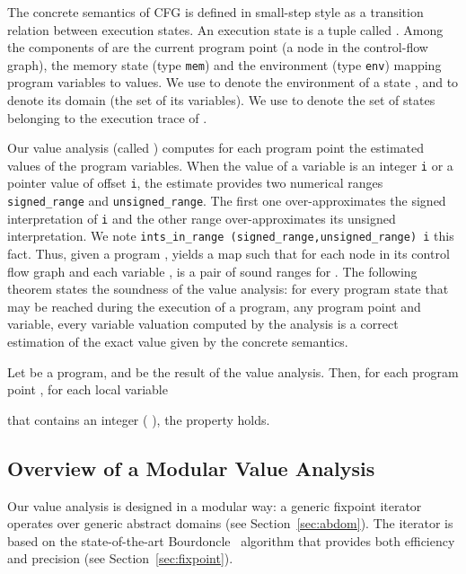 The concrete semantics of CFG is defined in small-step style as a
transition relation between execution states.  
An execution state is a tuple called . Among the components of
 are the current program point (\ie a node in the control-flow graph), 
the memory state (type \lstinline!mem!) and the environment
(type \lstinline!env!) mapping program variables to values.  
We use  to denote the environment of a state ,
and  to denote its domain (\ie the set of its
variables). We use 
 to denote the set of states belonging to the
execution trace of .

Our value analysis (called {\tt \valanal{}}) computes
for each program point the estimated values of the program variables.
When the value of a variable is an integer \lstinline!i!  or a pointer
value of offset \lstinline!i!, the estimate provides two numerical
ranges \lstinline!signed_range! and
\lstinline!unsigned_range!. The first one over-approximates the signed interpretation of
\lstinline!i! and the other range over-approximates its unsigned
interpretation. We note \lstinline!ints_in_range (signed_range,unsigned_range) i! this fact.
Thus, given a program ,   yields a map
such that for each node  in its control flow graph and
 each variable ,
 is a pair of sound ranges for .
The following theorem states the soundness of the value analysis: for
every program state that may be reached during the execution of a program,
any program point and variable, every variable valuation computed
by the analysis is a correct estimation of the exact value
given by the concrete semantics.

\begin{theorem}
Let  be a program,  and
 be the result of the value
analysis. Then, for each program point , for
each local variable

that contains an integer  {\textup(}\ie
{\textup)},
the property  holds. 
\end{theorem} 


\subsection{Overview of a Modular Value Analysis}

Our value analysis is designed in a modular way: a generic fixpoint iterator
operates over generic abstract domains (see Section~\ref{sec:abdom}). The iterator is based on the
state-of-the-art Bourdoncle~\cite{bourdoncle93} algorithm that provides both efficiency
and precision (see Section~\ref{sec:fixpoint}).

